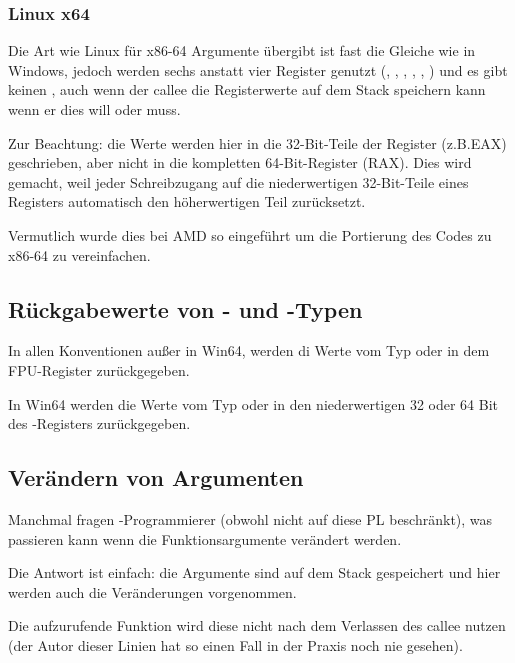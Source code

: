 \subsubsection{Linux x64}

Die Art wie Linux für x86-64 Argumente übergibt ist fast die Gleiche wie in Windows,
jedoch werden sechs anstatt vier Register genutzt (\RDI, \RSI, \RDX, \RCX, , )
und es gibt keinen , auch wenn der \gls{callee} die Registerwerte auf
dem Stack speichern kann wenn er dies will oder muss.

%


Zur Beachtung: die Werte werden hier in die 32-Bit-Teile der Register (z.B.EAX) geschrieben,
aber nicht in die kompletten 64-Bit-Register (RAX).
Dies wird gemacht, weil jeder Schreibzugang auf die niederwertigen 32-Bit-Teile eines
Registers automatisch den höherwertigen Teil zurücksetzt.

Vermutlich wurde dies bei AMD so eingeführt um die Portierung des Codes zu x86-64 zu vereinfachen.

\subsection{Rückgabewerte von \Tfloat- und \Tdouble-Typen}

In allen Konventionen außer in Win64, werden di Werte vom Typ \Tfloat oder \Tdouble
in dem FPU-Register  zurückgegeben.

In Win64 werden die Werte vom Typ \Tfloat oder \Tdouble in den niederwertigen 32 oder
64 Bit des -Registers zurückgegeben.

\subsection{Verändern von Argumenten}

Manchmal fragen \CCpp{}-Programmierer (obwohl nicht auf diese \ac{PL} beschränkt),
was passieren kann wenn die Funktionsargumente verändert werden.

Die Antwort ist einfach: die Argumente sind auf dem Stack gespeichert und hier
werden auch die Veränderungen vorgenommen.

Die aufzurufende Funktion wird diese nicht nach dem Verlassen des \gls{callee}
nutzen (der Autor dieser Linien hat so einen Fall in der Praxis noch nie gesehen).

